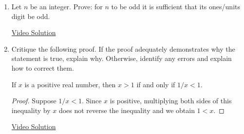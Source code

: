 \begin{enumerate}
  \item Let $n$ be an integer. Prove: for $n$ to be odd it is sufficient that its ones/units digit be odd.
  
  \href{https://youtu.be/9wHi0ojmvDg}{Video Solution}
  
  \item Critique the following proof.
    If the proof adequately demonstrates why the statement is true, explain why.
    Otherwise, identify any errors and explain how to correct them.
    \begin{thm*}{}{}
        If $x$ is a positive real number, then $x > 1$ if and only if $1/x < 1$.
    \end{thm*}
    \begin{proof}
        Suppose $1/x < 1$.
        Since $x$ is positive, multiplying both sides of this inequality by $x$ does not reverse the inequality and we obtain $1 < x$.
    \end{proof}
	
	\href{https://youtu.be/R_W3wwJRlmQ}{Video Solution}
\end{enumerate}